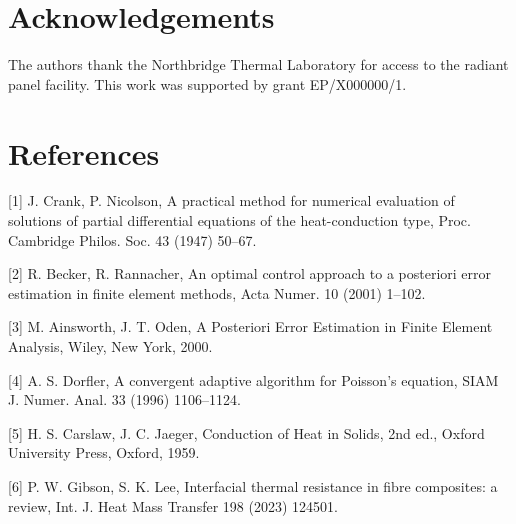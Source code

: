 \documentclass[11pt,a4paper]{article}
\begin{document}
\section*{Acknowledgements}
The authors thank the Northbridge Thermal Laboratory for access to the radiant
panel facility. This work was supported by grant EP/X000000/1.

\section*{References}
[1] J. Crank, P. Nicolson, A practical method for numerical evaluation of solutions
of partial differential equations of the heat-conduction type, Proc. Cambridge
Philos. Soc. 43 (1947) 50--67.

[2] R. Becker, R. Rannacher, An optimal control approach to a posteriori error
estimation in finite element methods, Acta Numer. 10 (2001) 1--102.

[3] M. Ainsworth, J. T. Oden, A Posteriori Error Estimation in Finite Element
Analysis, Wiley, New York, 2000.

[4] A. S. Dorfler, A convergent adaptive algorithm for Poisson's equation, SIAM J.
Numer. Anal. 33 (1996) 1106--1124.

[5] H. S. Carslaw, J. C. Jaeger, Conduction of Heat in Solids, 2nd ed., Oxford
University Press, Oxford, 1959.

[6] P. W. Gibson, S. K. Lee, Interfacial thermal resistance in fibre composites: a
review, Int. J. Heat Mass Transfer 198 (2023) 124501.
\end{document}
